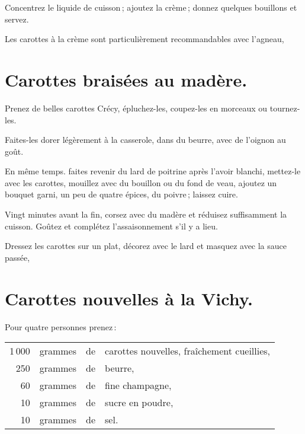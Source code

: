 Concentrez le liquide de cuisson ; ajoutez la crème ; donnez quelques bouillons
et servez.

\medskip

Les carottes à la crème sont particulièrement recommandables avec l'agneau,

\section*{\centering Carottes braisées au madère.}
{}

Prenez de belles carottes Crécy, épluchez-les, coupez-les en morceaux ou
tournez-les.

Faites-les dorer légèrement à la casserole, dans du beurre, avec de l'oignon au
goût.

En même temps. faites revenir du lard de poitrine après l'avoir blanchi,
mettez-le avec les carottes, mouillez avec du bouillon ou du fond de veau,
ajoutez un bouquet garni, un peu de quatre épices, du poivre ; laissez cuire.

Vingt minutes avant la fin, corsez avec du madère et réduisez suffisamment la
cuisson. Goûtez et complétez l'assaisonnement s'il y a lieu.

Dressez les carottes sur un plat, décorez avec le lard et masquez avec la sauce
passée,

\section*{\centering Carottes nouvelles à la Vichy.}
{}
\label{pg0770} \hypertarget{p0770}{}

Pour quatre personnes prenez :

\footnotesize
\begin{longtable}{rrrp{16em}}
  1 000 & grammes & de & carottes nouvelles, fraîchement cueillies,                                       \\
    250 & grammes & de & beurre,                                                                          \\
     60 & grammes & de & fine champagne,                                                                  \\
     10 & grammes & de & sucre en poudre,                                                                 \\
     10 & grammes & de & sel.                                                                             \\
\end{longtable}
\normalsize

